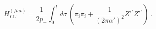\begin{equation}
\label{eq:flat Hamiltonian}
    H_{LC}^{(flat)} =
    \frac{1}{2 p_-}\int_0^l d\sigma \, \left(
    \pi_i \pi_i +
    \frac{1}{(2\pi\alpha')^2}
    Z^{i\,\prime} Z^{i\,\prime}
                     \right)\ .
\end{equation}


